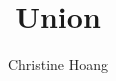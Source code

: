 \documentclass{article}
\title{Union}
\author{Christine Hoang}
\begin{document}
\maketitle

\section{}
\end{document}
